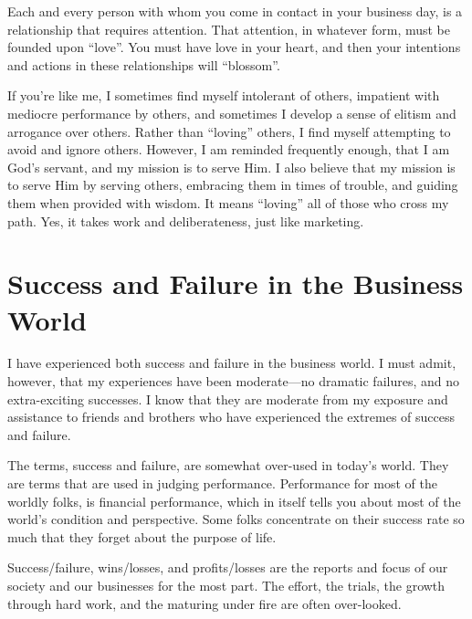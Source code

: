 \documentclass[12pt]{memoir}
\begin{document}
Each and every person with whom you come in contact in your business
day, is a relationship that requires attention. That attention, in
whatever form, must be founded upon ``love''. You must have love
in your heart, and then your intentions and actions in these relationships
will ``blossom''.

If you're like me, I sometimes find myself intolerant of others, impatient
with mediocre performance by others, and sometimes I develop a sense
of elitism and arrogance over others. Rather than ``loving'' others,
I find myself attempting to avoid and ignore others. However, I am
reminded frequently enough, that I am God's servant, and my mission
is to serve Him. I also believe that my mission is to serve Him by
serving others, embracing them in times of trouble, and guiding them
when provided with wisdom. It means ``loving'' all of those who
cross my path. Yes, it takes work and deliberateness, just like marketing.

\chapter{Success and Failure in the Business World}

I have experienced both success and failure in the business world.
I must admit, however, that my experiences have been moderate---no
dramatic failures, and no extra-exciting successes. I know that they
are moderate from my exposure and assistance to friends and brothers
who have experienced the extremes of success and failure.

The terms, success and failure, are somewhat over-used in today's
world. They are terms that are used in judging performance. Performance
for most of the worldly folks, is financial performance, which in
itself tells you about most of the world's condition and perspective.
Some folks concentrate on their success rate so much that they forget
about the purpose of life.

Success\slash{}failure, wins\slash{}losses, and profits\slash{}losses are the reports and
focus of our society and our businesses for the most part. The effort,
the trials, the growth through hard work, and the maturing under fire
are often over-looked.
\end{document}
